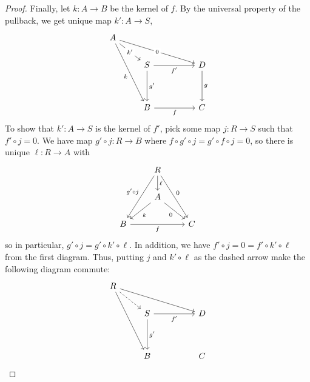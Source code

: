 \documentclass[aps,pra,showpacs,notitlepage,onecolumn,superscriptaddress,nofootinbib]{revtex4-1}
\theoremstyle{definition}
\begin{document}
\begin{proof}
  Finally, let $k : A \rightarrow B$ be the kernel of $f$. By the universal property of the pullback, we get unique map $k' : A \rightarrow S$,
  \[\begin{tikzcd}
	A \\
	& S && D \\
	\\
	& B && C
	\arrow["k'"{description}, from=1-1, to=2-2]
	\arrow["0"{description}, from=1-1, to=2-4]
	\arrow["k"', from=1-1, to=4-2]
	\arrow["{f'}"', from=2-2, to=2-4]
	\arrow["{g'}", from=2-2, to=4-2]
	\arrow["g", from=2-4, to=4-4]
	\arrow["f"', from=4-2, to=4-4]
  \end{tikzcd}\]
  To show that $k' : A \rightarrow S$ is the kernel of $f'$, pick some map $j : R \rightarrow S$ such that $f' \circ j = 0$. We have map $g' \circ j : R \rightarrow B$ where $f \circ g' \circ j = g' \circ f \circ j = 0$,
  so there is unique $\ell : R \rightarrow A$ with
  \[\begin{tikzcd}
	& R \\
	& A \\
	B && C
	\arrow["\ell", from=1-2, to=2-2]
	\arrow["{g'\circ j}"', from=1-2, to=3-1]
	\arrow["0", from=1-2, to=3-3]
	\arrow["k", from=2-2, to=3-1]
	\arrow["0"', from=2-2, to=3-3]
	\arrow["f"', from=3-1, to=3-3]
  \end{tikzcd}\]
  so in particular, $g' \circ j = g' \circ k' \circ \ell$. In addition, we have $f' \circ j = 0 = f' \circ k' \circ \ell$ from the first diagram. Thus, putting $j$ and $k' \circ \ell$ as the dashed arrow
  make the following diagram commute:
  \[\begin{tikzcd}
	R \\
	& S && D \\
	\\
	& B && C
	\arrow[dashed, from=1-1, to=2-2]
	\arrow[from=1-1, to=2-4]
	\arrow[from=1-1, to=4-2]
	\arrow["{f'}"', from=2-2, to=2-4]
	\arrow["{g'}", from=2-2, to=4-2]

\end{tikzcd}\]
\end{proof}
\end{document}
